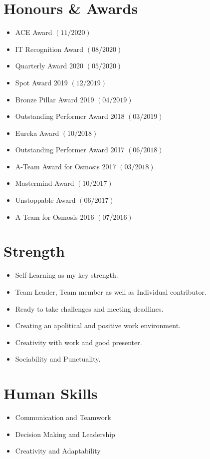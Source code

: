 \documentclass[11pt, a4paper]{article}
\begin{document}
\section*{\color{NavyBlue}Honours \& Awards}
\vspace{-2mm}
\begin{itemize}[noitemsep, nolistsep,label=\textcolor{NavyBlue}{\scriptsize\faTrophy}]
\item ACE Award $(11/2020)$
\item IT Recognition Award $(08/2020)$
\item Quarterly Award 2020 $(05/2020)$
\item Spot Award 2019 $(12/2019)$
\item Bronze Pillar Award 2019 $(04/2019)$
\item Outstanding Performer Award 2018 $(03/2019)$
\item Eureka Award $(10/2018)$
\item Outstanding Performer Award 2017 $(06/2018)$
\item A-Team Award for Osmosis 2017 $(03/2018)$
\item Mastermind Award $(10/2017)$
\item Unstoppable Award $(06/2017)$
\item A-Team for Osmosis 2016 $(07/2016)$
\end{itemize}

\section*{\color{NavyBlue}Strength}
\vspace{-2mm}
\begin{itemize}[noitemsep, nolistsep,label=\textcolor{NavyBlue}{\scriptsize\faArrowRight}]
\item Self-Learning as my key strength.
\item Team Leader, Team member as well as Individual contributor.
\item Ready to take challenges and meeting deadlines.
\item Creating an apolitical and positive work environment.
\item Creativity with work and good presenter.
\item Sociability and Punctuality.
\end{itemize}

\section*{\color{NavyBlue}Human Skills}
\vspace{-2mm}
\begin{itemize}[noitemsep, nolistsep,label=\textcolor{NavyBlue}{\scriptsize\faPlay}]
\item Communication and Teamwork
\item Decision Making and Leadership
\item Creativity and Adaptability
\end{itemize}
\end{document}
